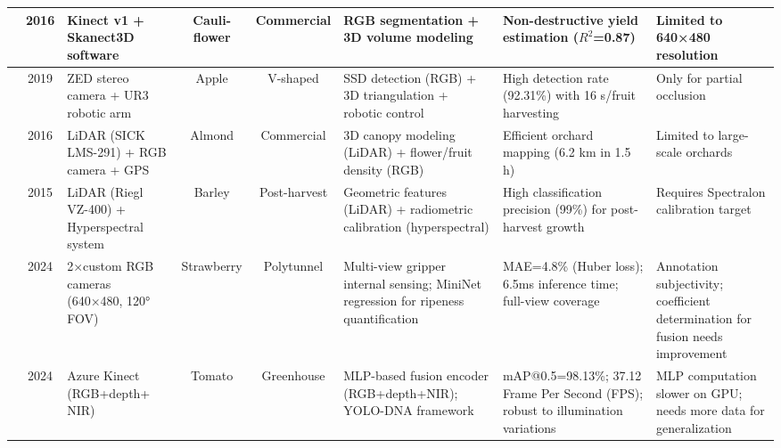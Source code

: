\documentclass{ieeeaccess}
\begin{document}
\begin{table}[ht]
\begin{tabularx}{\textwidth}{c c X c c X X X}
\hline
\cite{andujar2016using} & 2016 & Kinect v1 + Skanect3D software & Cauli- flower & Commercial & RGB segmentation + 3D volume modeling & Non-destructive yield estimation ($R^2$=0.87) & Limited to 640×480 resolution \\ 
\hline
\cite{onishi2019automated} & 2019 & ZED stereo camera + UR3 robotic arm & Apple & V-shaped & SSD detection (RGB) + 3D triangulation + robotic control & High detection rate (92.31\%) with 16 s/fruit harvesting & Only for partial occlusion \\ 
\hline
\cite{underwood2016mapping} & 2016 & LiDAR (SICK LMS-291) + RGB camera + GPS & Almond & Commercial & 3D canopy modeling (LiDAR) + flower/fruit density (RGB) & Efficient orchard mapping (6.2 km in 1.5 h) & Limited to large-scale orchards  \\ 
\hline
\cite{koenig2015comparative} & 2015 & LiDAR (Riegl VZ-400) + Hyperspectral system & Barley & Post-harvest & Geometric features (LiDAR) + radiometric calibration (hyperspectral) & High classification precision (99\%) for post-harvest growth & Requires Spectralon calibration target  \\ 
\hline
\cite{ge2024multi} & 2024 & 2×custom RGB cameras (640×480, 120° FOV) & Strawberry & Polytunnel & Multi-view gripper internal sensing; MiniNet regression for ripeness quantification & MAE=4.8\% (Huber loss); 6.5ms inference time; full-view coverage & Annotation subjectivity; coefficient determination for fusion needs improvement \\
\hline
\cite{chen2024mlp} & 2024 & Azure Kinect (RGB+depth+ NIR) & Tomato & Greenhouse & MLP-based fusion encoder (RGB+depth+NIR); YOLO-DNA framework & mAP@0.5=98.13\%; 37.12 Frame Per Second (FPS); robust to illumination variations & MLP computation slower on GPU; needs more data for generalization  \\
\hline
\end{tabularx}
\end{table}
\end{document}

